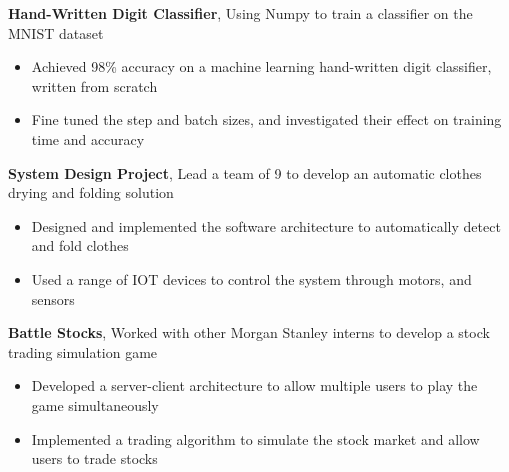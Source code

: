 \documentclass[]{article}
\begin{document}
\textbf{Hand-Written Digit Classifier}, Using Numpy to train a classifier on the MNIST dataset
\begin{itemize}
	\item Achieved 98\% accuracy on a machine learning hand-written digit classifier, written from scratch
	\item Fine tuned the step and batch sizes, and investigated their effect on training time and accuracy
\end{itemize}


\textbf{System Design Project}, Lead a team of 9 to develop an automatic clothes drying and folding solution
\begin{itemize}
	\item Designed and implemented the software architecture to automatically detect and fold clothes
	\item Used a range of IOT devices to control the system through motors, and sensors
\end{itemize}

\textbf{Battle Stocks}, Worked with other Morgan Stanley interns to develop a stock trading simulation game
\begin{itemize}
	\item Developed a server-client architecture to allow multiple users to play the game simultaneously
	\item Implemented a trading algorithm to simulate the stock market and allow users to trade stocks
\end{itemize}

\end{document}
